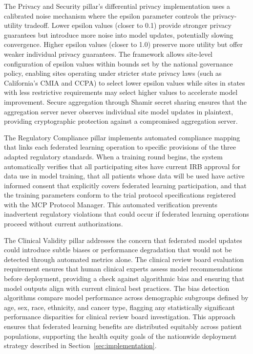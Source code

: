 The Privacy and Security pillar's differential privacy implementation uses a
calibrated noise mechanism where the epsilon parameter controls the
privacy-utility tradeoff. Lower epsilon values (closer to 0.1) provide stronger
privacy guarantees but introduce more noise into model updates, potentially
slowing convergence. Higher epsilon values (closer to 1.0) preserve more
utility but offer weaker individual privacy guarantees. The framework allows
site-level configuration of epsilon values within bounds set by the national
governance policy, enabling sites operating under stricter state privacy laws
(such as California's CMIA and CCPA) to select lower epsilon values while sites
in states with less restrictive requirements may select higher values to
accelerate model improvement. Secure aggregation through Shamir secret sharing
ensures that the aggregation server never observes individual site model
updates in plaintext, providing cryptographic protection against a compromised
aggregation server.

The Regulatory Compliance pillar implements automated compliance mapping that
links each federated learning operation to specific provisions of the three
adapted regulatory standards. When a training round begins, the system
automatically verifies that all participating sites have current IRB approval
for data use in model training, that all patients whose data will be used have
active informed consent that explicitly covers federated learning participation,
and that the training parameters conform to the trial protocol specifications
registered with the MCP Protocol Manager. This automated verification prevents
inadvertent regulatory violations that could occur if federated learning
operations proceed without current authorizations.

The Clinical Validity pillar addresses the concern that federated model updates
could introduce subtle biases or performance degradation that would not be
detected through automated metrics alone. The clinical review board evaluation
requirement ensures that human clinical experts assess model recommendations
before deployment, providing a check against algorithmic bias and ensuring that
model outputs align with current clinical best practices. The bias detection
algorithms compare model performance across demographic subgroups defined by
age, sex, race, ethnicity, and cancer type, flagging any statistically
significant performance disparities for clinical review board investigation.
This approach ensures that federated learning benefits are distributed equitably
across patient populations, supporting the health equity goals of the nationwide
deployment strategy described in Section~\ref{sec:implementation}.

